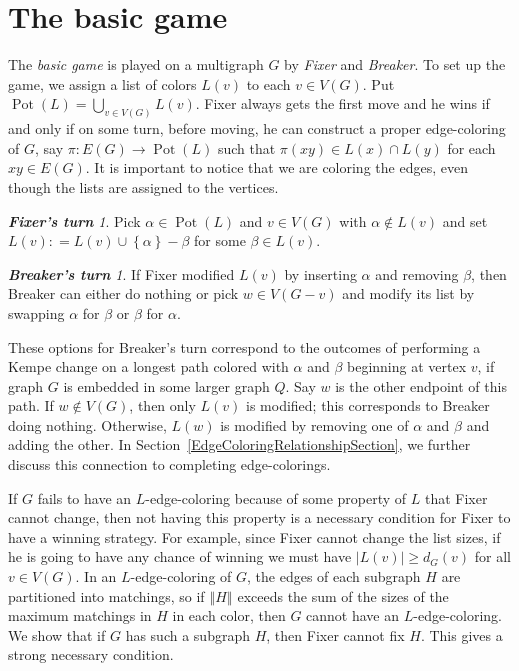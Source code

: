 \documentclass[12pt,reqno]{amsart}
\theoremstyle{plain}
\theoremstyle{definition}
\theoremstyle{remark}
\newtheorem*{FixerMove}{\bf {Fixer's turn}}
\newtheorem*{BreakerMove}{\bf {Breaker's turn}}
\newcommand{\set}[1]{\left\{ #1 \right\}}
\newcommand{\card}[1]{\left|#1\right|}
\newcommand{\size}[1]{\left\Vert#1\right\Vert}
\newcommand{\func}[3]{#1\colon #2 \rightarrow #3}
\newcommand{\DefinedAs}{\mathrel{\mathop:}=}
\newcommand{\pot}{\operatorname{Pot}}
\begin{document}
\section{The basic game}
The \emph{basic game} is played on a multigraph $G$ by \emph{Fixer} and
\emph{Breaker}.  To set up the game, we assign a list of colors $L(v)$ to each
$v \in V(G)$. Put $\pot(L) = \bigcup_{v \in V(G)} L(v)$.
Fixer always gets the first move and he wins if and only if on some turn, before moving, he can construct a proper edge-coloring of $G$, say $\func{\pi}{E(G)}{\pot(L)}$ such that
$\pi(xy) \in L(x) \cap L(y)$ for each $xy \in E(G)$.
It is important to notice that we are coloring the edges, even though the lists
are assigned to the vertices.

\begin{FixerMove}
Pick $\alpha \in \pot(L)$ and $v \in V(G)$ with $\alpha \not \in L(v)$ and set $L(v)
\DefinedAs L(v) \cup \set{\alpha} - \beta$ for some $\beta
\in L(v)$.
\end{FixerMove}

\begin{BreakerMove}
If Fixer modified $L(v)$ by inserting $\alpha$ and removing $\beta$, then
Breaker can either do nothing or pick $w \in V(G - v)$ and modify its list by
swapping $\alpha$ for $\beta$ or $\beta$ for $\alpha$.
\end{BreakerMove}


\noindent
These options for Breaker's turn correspond to the outcomes of performing a
Kempe change on a longest path colored with $\alpha$ and $\beta$ beginning at
vertex $v$, if graph $G$ is embedded in some larger graph $Q$.  Say $w$ is the
other endpoint of this path. If $w \not \in V(G)$, then only $L(v)$ is modified; this corresponds to Breaker doing nothing.  
Otherwise, $L(w)$ is modified by removing one of
$\alpha$ and $\beta$ and adding the other.  In Section~\ref{EdgeColoringRelationshipSection},
we further discuss this connection to completing edge-colorings.

\bigskip
\noindent If $G$ fails to have an $L$-edge-coloring because of some property of $L$ that Fixer cannot change, then not having this property is a necessary condition for Fixer to have a winning strategy.  For example,
since Fixer cannot change the list sizes, if he is going to have any chance of winning we must have $\card{L(v)} \ge d_G(v)$ for all $v \in V(G)$.  In an $L$-edge-coloring of $G$, the edges of each subgraph $H$ are partitioned into matchings, so if $\size{H}$ exceeds the sum of the sizes of the maximum matchings in $H$ in each color, then $G$ cannot have an $L$-edge-coloring.  We show that if $G$ has such a subgraph $H$, then Fixer cannot fix $H$.  This gives a strong necessary condition.
\end{document}
